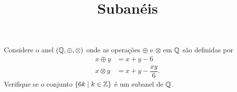 \documentclass{beamer}
\title{Subanéis}
\author[\autor]{\autor}
\institute[\instituto]{\instituto}
\date{}
\begin{document}
    \begin{frame}
        \maketitle
    \end{frame}


    \begin{frame}
        \begin{exercicio}
            Considere o anel $(\mathbb{Q}, \oplus, \otimes)$ onde as operações $\oplus$ e $\otimes$ em $\mathbb{Q}$ são definidas por
            \begin{align*}
                x \oplus y &= x + y - 6\\
                x \otimes y &= x + y - \dfrac{xy}{6}.
            \end{align*}
            Verifique se o conjunto $\{6k \mid k \in \mathbb{Z}\}$ é um subanel de $\mathbb{Q}$.
        \end{exercicio}
    \end{frame}
\end{document}
